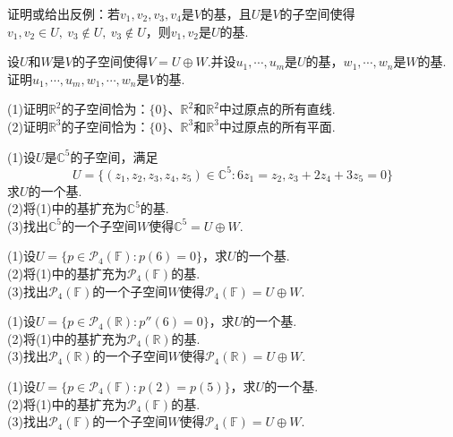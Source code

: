 \documentclass[lang=cn, zihao=5]{elegantbook}
\newcommand{\R}{\mathbb{R}}
\newcommand{\C}{\mathbb{C}}
\newcommand{\F}{\mathbb{F}}
\begin{document}
\begin{exercise}
	证明或给出反例：若$v_1,v_2,v_3,v_4$是$V$的基，且$U$是$V$的子空间使得$v_1,v_2 \in U,~ v_3 \notin U ,~ v_3 \notin U$，则$v_1,v_2$是$U$的基.
\end{exercise}

\begin{exercise}
	设$U$和$W$是$V$的子空间使得$V=U \oplus W$.并设$u_1, \cdots ,u_m$是$U$的基，$w_1, \cdots ,w_n$是$W$的基.证明$u_1, \cdots ,u_m,w_1, \cdots ,w_n$是$V$的基.
\end{exercise}

\begin{exercise}
	(1)证明$\R ^{2}$的子空间恰为：$\{ 0 \}$、$\R ^2$和$\R ^2$中过原点的所有直线. \\
    (2)证明$\R ^{3}$的子空间恰为：$\{ 0 \}$、$\R ^3$和$\R ^3$中过原点的所有平面.
\end{exercise}

\begin{exercise}
	(1)设$U$是$\C ^{5}$的子空间，满足$$U= \{ (z_1,z_2,z_3,z_4,z_5) \in \C ^{5} : 6z_1=z_2,z_3+2z_4+3z_5=0 \}$$
	求$U$的一个基. \\
	(2)将(1)中的基扩充为$\C ^{5}$的基. \\
	(3)找出$\C ^{5}$的一个子空间$W$使得$\C ^{5} = U \oplus W$.
\end{exercise}

\begin{exercise}
	(1)设$U=\{ p \in \mathcal{P}_{4} (\F) : p(6)=0 \}$，求$U$的一个基. \\
	(2)将(1)中的基扩充为$\mathcal{P}_{4} (\F)$的基. \\
	(3)找出$\mathcal{P}_{4} (\F)$的一个子空间$W$使得$\mathcal{P}_{4} (\F) = U \oplus W$.
\end{exercise}

\begin{exercise}
	(1)设$U=\{ p \in \mathcal{P}_{4} (\R) : p''(6)=0 \}$，求$U$的一个基. \\
	(2)将(1)中的基扩充为$\mathcal{P}_{4} (\R)$的基. \\
	(3)找出$\mathcal{P}_{4} (\R)$的一个子空间$W$使得$\mathcal{P}_{4} (\R) = U \oplus W$.
\end{exercise}

\begin{exercise}
	(1)设$U=\{ p \in \mathcal{P}_{4} (\F) : p(2)=p(5) \}$，求$U$的一个基. \\
	(2)将(1)中的基扩充为$\mathcal{P}_{4} (\F)$的基. \\
	(3)找出$\mathcal{P}_{4} (\F)$的一个子空间$W$使得$\mathcal{P}_{4} (\F) = U \oplus W$.
\end{exercise}
\end{document}
